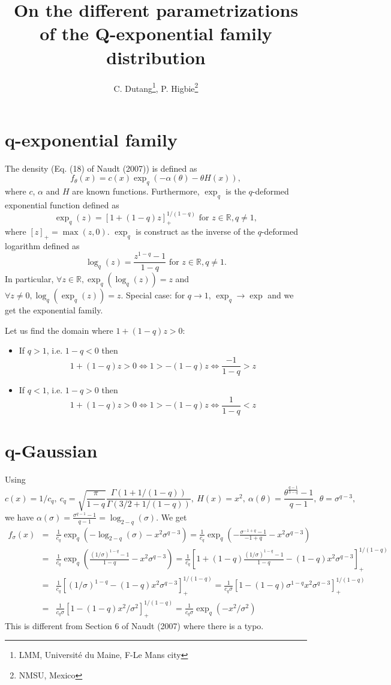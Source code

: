 \documentclass[11pt]{article}
\title{On the different parametrizations of the Q-exponential family distribution}
\author{C. Dutang\footnote{LMM, Universit\'e du Maine, F-Le Mans city}, P. Higbie\footnote{NMSU, Mexico}}
\newcommand{\R}{\mathbb R}
\begin{document}


\maketitle

\section{q-exponential family}
The density (Eq. (18) of Naudt (2007)) is defined as
$$
f_\theta(x) = c(x) \exp_q(-\alpha(\theta)-\theta H(x)),
$$
where $c$, $\alpha$ and $H$ are known functions.
Furthermore, $\exp_q$ is the $q$-deformed exponential function defined as
$$
\exp_q(z)= [1+(1-q)z]_+^{1/(1-q)} \text{ for } z\in\R, q\neq 1,
$$
where $[z]_+=\max(z,0)$. 
$\exp_q$ is construct as the inverse of the $q$-deformed logarithm defined as
$$
\log_q(z) = \frac{z^{1-q}-1}{1-q} \text{ for } z\in\R, q\neq 1.
$$
In particular, $\forall z\in\R, \exp_q(\log_q(z)) =z$ and $\forall z\neq0, \log_q(\exp_q(z)) =z$.
Special case: for $q\rightarrow1$, $\exp_q\rightarrow \exp$ and we get the exponential family.


Let us find the domain where $1+(1-q)z>0$:
\begin{itemize}
\item
If $q>1$, i.e. $1-q< 0$ then
$$
1+(1-q) z >0
\Leftrightarrow 1>-(1-q) z
\Leftrightarrow \frac{-1}{1-q}>z
$$
\item
If $q<1$, i.e. $1-q> 0$ then
$$
1+(1-q) z >0
\Leftrightarrow 1>-(1-q) z
\Leftrightarrow \frac{1}{1-q}<z
$$
\end{itemize}




\newpage
\section{q-Gaussian}
Using 
$$
c(x) = 1/c_q, ~
c_q = \sqrt{\frac{\pi}{1-q}} \frac{\Gamma(1+1/(1-q))}{\Gamma(3/2+1/(1-q))},~
H(x)=x^2,~
\alpha(\theta) = \frac{\theta^{\frac{q-1}{3-q}}-1}{q-1},~
\theta=\sigma^{q-3},
$$
we have $\alpha(\sigma) = \frac{\sigma^{q-1}-1}{q-1}=\log_{2-q}(\sigma)$.
We get
\begin{eqnarray*}
f_\sigma(x) 
&=& \frac{1}{c_q} \exp_q(-\log_{2-q}(\sigma) - x^2\sigma^{q-3})
= \frac{1}{c_q} \exp_q(- \frac{\sigma^{-1+q}-1}{-1+q} - x^2\sigma^{q-3})
\\
&=& \frac{1}{c_q} \exp_q( \frac{(1/\sigma)^{1-q}-1}{1-q} - x^2\sigma^{q-3})
= \frac{1}{c_q} \left[1+(1-q)\frac{(1/\sigma)^{1-q}-1}{1-q} - (1-q)x^2\sigma^{q-3}\right]_+^{1/(1-q)}
\\
&=&
\frac{1}{c_q} \left[(1/\sigma)^{1-q} - (1-q)x^2\sigma^{q-3}\right]_+^{1/(1-q)}
=\frac{1}{c_q\sigma} \left[ 1 -  (1-q)\sigma^{1-q} x^2\sigma^{q-3}\right]_+^{1/(1-q)}  
\\
&=&
\frac{1}{c_q\sigma} \left[ 1 -  (1-q)x^2/\sigma^{2} \right]_+^{1/(1-q)}  
= \frac{1}{c_q\sigma}\exp_q(-x^2/\sigma^2)
\end{eqnarray*}
This is different from Section 6 of Naudt (2007) where there is a typo.
\end{document}

